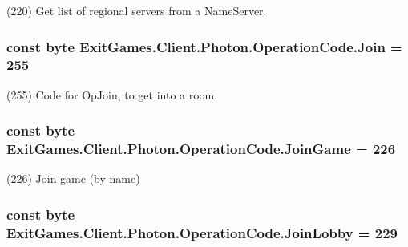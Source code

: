 (220) Get list of regional servers from a Name\+Server.

\subsubsection[{\texorpdfstring{Join}{Join}}]{\setlength{\rightskip}{0pt plus 5cm}const byte Exit\+Games.\+Client.\+Photon.\+Operation\+Code.\+Join = 255}\hypertarget{class_exit_games_1_1_client_1_1_photon_1_1_operation_code_ab40167d42ef70df40f89864db5085c68}{}\label{class_exit_games_1_1_client_1_1_photon_1_1_operation_code_ab40167d42ef70df40f89864db5085c68}


(255) Code for Op\+Join, to get into a room.

\subsubsection[{\texorpdfstring{Join\+Game}{JoinGame}}]{\setlength{\rightskip}{0pt plus 5cm}const byte Exit\+Games.\+Client.\+Photon.\+Operation\+Code.\+Join\+Game = 226}\hypertarget{class_exit_games_1_1_client_1_1_photon_1_1_operation_code_a98972f7fc4a8965ef0597387b298bba2}{}\label{class_exit_games_1_1_client_1_1_photon_1_1_operation_code_a98972f7fc4a8965ef0597387b298bba2}


(226) Join game (by name)

\subsubsection[{\texorpdfstring{Join\+Lobby}{JoinLobby}}]{\setlength{\rightskip}{0pt plus 5cm}const byte Exit\+Games.\+Client.\+Photon.\+Operation\+Code.\+Join\+Lobby = 229}\hypertarget{class_exit_games_1_1_client_1_1_photon_1_1_operation_code_a160904b6b125f48aeee0a33f7745aa6b}{}\label{class_exit_games_1_1_client_1_1_photon_1_1_operation_code_a160904b6b125f48aeee0a33f7745aa6b}


